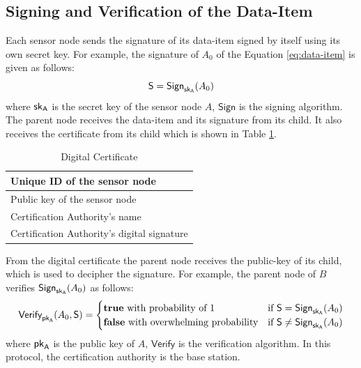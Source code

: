 	\subsection{Signing and Verification of the Data-Item}
		\label{subsection:Signing and Verification of the Data-Item}
		Each sensor node sends the signature of its data-item signed by itself using its own secret key. 
		For example, the signature of $A_{0}$ of the Equation \ref{eq:data-item} is given as follows:
		\begin{equation}
			\label{eq:sign-data-item}
			\textsf{S} = \textsf{Sign}_{\sf{sk}_{A}}(A_{0})
		\end{equation}
		where $\sf{sk}_{A}$ is the secret key of the sensor node $A$, $\textsf{Sign}$ is the signing algorithm.
		The parent node receives the data-item and its signature from its child. 
		It also receives the certificate from its child which is shown in Table \ref{table:digital-certificate}.		
		\begin{table}[!htb]	
	  		\caption{Digital Certificate}
			  \label{table:digital-certificate}
				\centering
				\begin{tabular}{ |l| }
				    \hline
				    Unique ID of the sensor node \\
				    \hline
				    Public key of the sensor node \\	
				    \hline
				    Certification Authority's name \\
				    \hline
				    Certification Authority's digital signature \\
				    \hline
				\end{tabular}
	 	\end{table}
		From the digital certificate the parent node receives the public-key of its child, which is used to decipher the signature.
		For example, the parent node of $B$ verifies $\textsf{Sign}_{\sf{sk}_{A}}(A_{0})$ as follows:
	  	\begin{equation}
			\textsf{Verify}_{\sf{pk}_{A}}(A_{0},\textsf{S}) = 
			\begin{cases}
			 \textbf{true}\ \mbox{with probability of 1} & \mbox{if}\ \textsf{S} = \textsf{Sign}_{\sf{sk}_{A}}(A_{0})\\
			 \textbf{false}\ \mbox{with overwhelming probability} & \mbox{if}\ \textsf{S} \neq \textsf{Sign}_{\sf{sk}_{A}}(A_{0})
			\end{cases}
			\label{eq:verification}
		\end{equation}
	  	where $\sf{pk}_{A}$ is the public key of $A$, $\textsf{Verify}$ is the verification algorithm.
		In this protocol, the certification authority is the base station.

